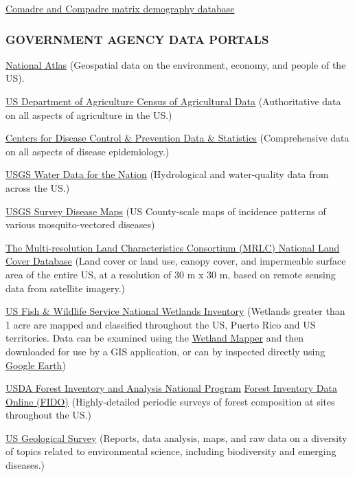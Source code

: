 \documentclass[
]{article}
\begin{document}
\href{https://compadredb.wordpress.com/2015/10/05/introducing-the-comadre-animal-matrix-database/}{Comadre
and Compadre matrix demography database}

\hypertarget{government-agency-data-portals}{%
\subsubsection{GOVERNMENT AGENCY DATA
PORTALS}\label{government-agency-data-portals}}

\href{http://www.nationalatlas.gov/}{National Atlas} (Geospatial data on
the environment, economy, and people of the US).

\href{http://www.agcensus.usda.gov/}{US Department of Agriculture Census
of Agricultural Data} (Authoritative data on all aspects of agriculture
in the US.)

\href{http://www.cdc.gov/datastatistics/}{Centers for Disease Control \&
Prevention Data \& Statistics} (Comprehensive data on all aspects of
disease epidemiology.)

\href{http://waterdata.usgs.gov/nwis}{USGS Water Data for the Nation}
(Hydrological and water-quality data from across the US.)

\href{http://diseasemaps.usgs.gov/index.html}{USGS Survey Disease Maps}
(US County-scale maps of incidence patterns of various mosquito-vectored
diseases)

\href{http://www.mrlc.gov/}{The Multi-resolution Land Characteristics
Consortium (MRLC) National Land Cover Database} (Land cover or land use,
canopy cover, and impermeable surface area of the entire US, at a
resolution of 30 m x 30 m, based on remote sensing data from satellite
imagery.)

\href{http://www.fws.gov/wetlands/}{US Fish \& Wildlife Service National
Wetlands Inventory} (Wetlands greater than 1 acre are mapped and
classified throughout the US, Puerto Rico and US territories. Data can
be examined using the
\href{http://www.fws.gov/wetlands/Data/Mapper.html}{Wetland Mapper} and
then downloaded for use by a GIS application, or can by inspected
directly using
\href{http://www.fws.gov/wetlands/Data/GoogleEarth.html}{Google Earth})

\href{http://fia.fs.fed.us/}{USDA Forest Inventory and Analysis National
Program} \href{http://fia.fs.fed.us/tools-data/default.asp}{Forest
Inventory Data Online (FIDO)} (Highly-detailed periodic surveys of
forest composition at sites throughout the US.)

\href{http://www.usgs.gov/}{US Geological Survey} (Reports, data
analysis, maps, and raw data on a diversity of topics related to
environmental science, including biodiversity and emerging diseases.)
\end{document}
